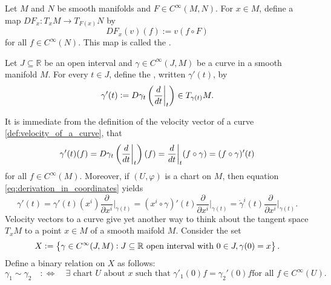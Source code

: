 \begin{definition}[Differential]
	Let $M$ and $N$ be smooth manifolds and $F \in C^\infty(M,N)$. For $x \in M$, define a map $DF_x : T_xM \to T_{F(x)}N$ by
	\begin{equation*}
		DF_x(v)(f) := v(f \circ F)
	\end{equation*}
	\noindent for all $f \in C^\infty(N)$. This map is called the .
\end{definition}

\begin{definition}
	\label{def:velocity_of_a_curve}
	Let $J \subseteq \mathbb{R}$ be an open interval and $\gamma \in C^\infty(J,M)$ be a curve in a smooth manifold $M$. For every $t \in J$, define the , written $\gamma'(t)$, by
	\begin{equation*}
		\gamma'(t) := D\gamma_t\del[3]{\frac{d}{dt}\bigg\vert_t} \in T_{\gamma(t)}M.
	\end{equation*}
\end{definition}

It is immediate from the definition of the velocity vector of a curve \ref{def:velocity_of_a_curve}, that
\begin{equation*}
	\gamma'(t)(f) = D\gamma_t\del[3]{\frac{d}{dt}\bigg\vert_t}(f) = \frac{d}{dt}\bigg\vert_t(f \circ \gamma) = (f \circ \gamma)'(t)
\end{equation*}
\noindent for all $f \in C^\infty(M)$. Moreover, if $(U,\varphi)$ is a chart on $M$, then equation \ref{eq:derivation_in_coordinates} yields
\begin{equation*}
	\gamma'(t) = \gamma'(t)(x^i)\frac{\partial}{\partial x^i}\bigg\vert_{\gamma(t)} = (x^i \circ \gamma)'(t)\frac{\partial}{\partial x^i}\bigg\vert_{\gamma(t)} = \dot{\gamma}^i(t)\frac{\partial}{\partial x^i}\bigg\vert_{\gamma(t)}.
\end{equation*}
Velocity vectors to a curve give yet another way to think about the tangent space $T_xM$ to a point $x \in M$ of a smooth maifold $M$. Consider the set
\begin{equation*}
	X := \cbr{\gamma \in C^\infty(J,M) : J \subseteq \mathbb{R} \text{ open interval with } 0\in J, \gamma(0) = x}.
\end{equation*}
Define a binary relation on $X$ as follows:
\begin{equation*}
	\gamma_1 \sim \gamma_2 \quad :\Leftrightarrow \quad \exists \text{ chart $U$ about $x$ such that } \gamma'_1(0)f = \gamma_2'(0)f \text{for all } f \in C^\infty(U). 
\end{equation*}

